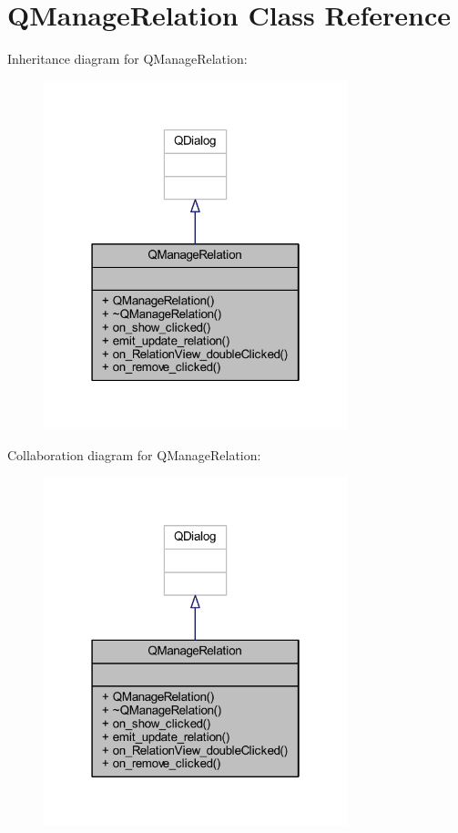 \hypertarget{class_q_manage_relation}{}\section{Q\+Manage\+Relation Class Reference}
\label{class_q_manage_relation}


Inheritance diagram for Q\+Manage\+Relation\+:\nopagebreak
\begin{figure}[H]
\begin{center}
\leavevmode
\includegraphics[width=250pt]{class_q_manage_relation__inherit__graph}
\end{center}
\end{figure}


Collaboration diagram for Q\+Manage\+Relation\+:\nopagebreak
\begin{figure}[H]
\begin{center}
\leavevmode
\includegraphics[width=250pt]{class_q_manage_relation__coll__graph}
\end{center}
\end{figure}
